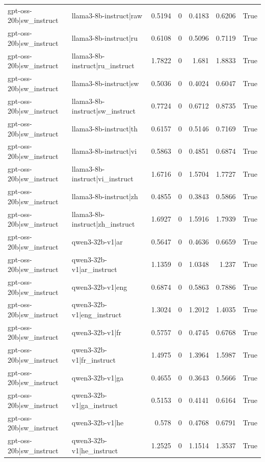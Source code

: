 \begin{table}
\begin{tabular}{l l r r r r l}
gpt-oss-20b|sw_instruct & llama3-8b-instruct|raw & 0.5194 & 0 & 0.4183 & 0.6206 & True \\
gpt-oss-20b|sw_instruct & llama3-8b-instruct|ru & 0.6108 & 0 & 0.5096 & 0.7119 & True \\
gpt-oss-20b|sw_instruct & llama3-8b-instruct|ru_instruct & 1.7822 & 0 & 1.681 & 1.8833 & True \\
gpt-oss-20b|sw_instruct & llama3-8b-instruct|sw & 0.5036 & 0 & 0.4024 & 0.6047 & True \\
gpt-oss-20b|sw_instruct & llama3-8b-instruct|sw_instruct & 0.7724 & 0 & 0.6712 & 0.8735 & True \\
gpt-oss-20b|sw_instruct & llama3-8b-instruct|th & 0.6157 & 0 & 0.5146 & 0.7169 & True \\
gpt-oss-20b|sw_instruct & llama3-8b-instruct|vi & 0.5863 & 0 & 0.4851 & 0.6874 & True \\
gpt-oss-20b|sw_instruct & llama3-8b-instruct|vi_instruct & 1.6716 & 0 & 1.5704 & 1.7727 & True \\
gpt-oss-20b|sw_instruct & llama3-8b-instruct|zh & 0.4855 & 0 & 0.3843 & 0.5866 & True \\
gpt-oss-20b|sw_instruct & llama3-8b-instruct|zh_instruct & 1.6927 & 0 & 1.5916 & 1.7939 & True \\
gpt-oss-20b|sw_instruct & qwen3-32b-v1|ar & 0.5647 & 0 & 0.4636 & 0.6659 & True \\
gpt-oss-20b|sw_instruct & qwen3-32b-v1|ar_instruct & 1.1359 & 0 & 1.0348 & 1.237 & True \\
gpt-oss-20b|sw_instruct & qwen3-32b-v1|eng & 0.6874 & 0 & 0.5863 & 0.7886 & True \\
gpt-oss-20b|sw_instruct & qwen3-32b-v1|eng_instruct & 1.3024 & 0 & 1.2012 & 1.4035 & True \\
gpt-oss-20b|sw_instruct & qwen3-32b-v1|fr & 0.5757 & 0 & 0.4745 & 0.6768 & True \\
gpt-oss-20b|sw_instruct & qwen3-32b-v1|fr_instruct & 1.4975 & 0 & 1.3964 & 1.5987 & True \\
gpt-oss-20b|sw_instruct & qwen3-32b-v1|ga & 0.4655 & 0 & 0.3643 & 0.5666 & True \\
gpt-oss-20b|sw_instruct & qwen3-32b-v1|ga_instruct & 0.5153 & 0 & 0.4141 & 0.6164 & True \\
gpt-oss-20b|sw_instruct & qwen3-32b-v1|he & 0.578 & 0 & 0.4768 & 0.6791 & True \\
gpt-oss-20b|sw_instruct & qwen3-32b-v1|he_instruct & 1.2525 & 0 & 1.1514 & 1.3537 & True \\

\end{tabular}
\end{table}
